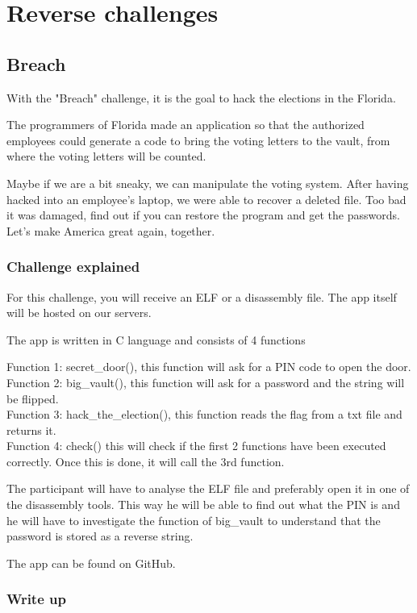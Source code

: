 \documentclass[../main.tex]{subfiles}
\begin{document}
\section{Reverse challenges}

\subsection{Breach}
With the "Breach" challenge, it is the goal to hack the elections in the Florida. 

The programmers of Florida made an application so that the authorized employees could generate a code to bring the voting letters to the vault, from where the voting letters will be counted.

Maybe if we are a bit sneaky, we can manipulate the voting system. After having hacked into an employee's laptop, we were able to recover a deleted file. Too bad it was damaged, find out if you can restore the program and get the passwords. Let's make America great again, together.

\subsubsection{Challenge explained}

For this challenge, you will receive an ELF or a disassembly file. The app itself will be hosted on our servers.

The app is written in C language and consists of 4 functions

Function 1: secret\_door(), this function will ask for a PIN code to open the door.\\
Function 2: big\_vault(), this function will ask for a password and the string will be flipped.\\
Function 3: hack\_the\_election(), this function reads the flag from a txt file and returns it.\\
Function 4: check() this will check if the first 2 functions have been executed correctly. Once this is done, it will call the 3rd function.

The participant will have to analyse the ELF file and preferably open it in one of the disassembly tools. This way he will be able to find out what the PIN is and he will have to investigate the function of big\_vault to understand that the password is stored as a reverse string. 

The app can be found on GitHub.

\subsubsection{Write up}
\end{document}
